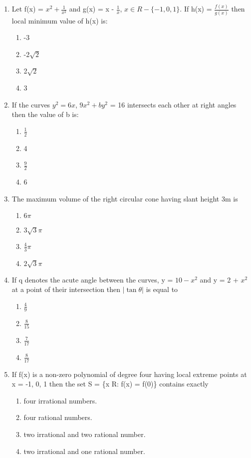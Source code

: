 \begin{enumerate}[label=\arabic*.,ref=\thesubsection.\theenumi]
\item Let f(x) = $x^2 + \frac{1}{x^2}$ and g(x) = x - $\frac{1}{x}$, $x \in R-\{-1, 0, 1\}$. If h(x) = $\frac{f(x)}{g(x)}$ then local minimum value of h(x) is:
\begin{enumerate}
\item -3
\item -2$\sqrt{2}$
\item 2$\sqrt{2}$
\item 3
\end{enumerate}

\item If the curves $y^2 = 6x$, $9x^2 + by^2$ = 16 intersects each other at right angles then the value of b is:
\begin{enumerate}
\item $\frac{1}{2}$
\item 4
\item $\frac{9}{2}$
\item 6
\end{enumerate}

\item The maximum volume of the right circular cone having slant height 3m is
\begin{enumerate}
\item $6\pi$
\item $3\sqrt{3}\pi$
\item $\frac{4}{3}\pi$
\item $2\sqrt{3}\pi$
\end{enumerate}

\item If q denotes the acute angle between the curves, y = $10 - x^2$ and y = 2 + $x^2$ at a point of their intersection then $|\tan \theta|$ is equal to 
\begin{enumerate}
\item $\frac{4}{9}$
\item $\frac{8}{15}$
\item $\frac{7}{17}$
\item $\frac{8}{17}$
\end{enumerate}

\item If f(x) is a non-zero polynomial of degree four having local extreme points at x = -1, 0, 1 then the set 
S = \{x R: f(x) = f(0)\} contains exactly
\begin{enumerate}
\item four irrational numbers.
\item four rational numbers. 
\item two irrational and two rational number.
\item two irrational and one rational number.
\end{enumerate}


\end{enumerate}
